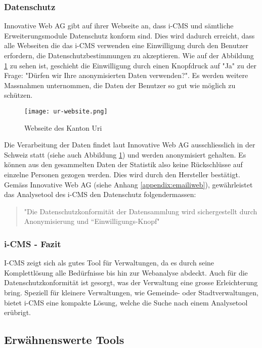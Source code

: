 \subsubsection{Datenschutz}
Innovative Web AG gibt auf ihrer Webseite \parencite{iwebwebsiteKanotonWeb} an, dass i-CMS und sämtliche Erweiterungsmodule Datenschutz konform sind. Dies wird dadurch erreicht, dass alle Webseiten die das i-CMS verwenden eine Einwilligung durch den Benutzer erfordern, die Datenschutzbestimmungen zu akzeptieren. Wie auf der Abbildung \ref{fig: urweb} zu sehen ist, geschieht die Einwilligung durch einen Knopfdruck auf "Ja" zu der Frage: "Dürfen wir Ihre anonymisierten Daten verwenden?". Es werden weitere Massnahmen unternommen, die Daten der Benutzer so gut wie möglich zu schützen.

\begin{figure}[h]
  \centering
  \texttt{[image: ur-website.png]}
  \caption{Webseite des Kanton Uri \parencite{webseiteKantonUri}}
  \label{fig: urweb}
\end{figure}

Die Verarbeitung der Daten findet laut Innovative Web AG \parencite{iwebwebsiteCMS} ausschliesslich in der Schweiz statt (siehe auch Abbildung \ref{fig: urweb}) und werden anonymisiert gehalten. Es können aus den gesammelten Daten der Statistik also keine Rückschlüsse auf einzelne Personen gezogen werden. Dies wird durch den Hersteller bestätigt. Gemäss Innovative Web AG (siehe Anhang \ref{appendix:emailiweb}), gewährleistet das Analysetool des i-CMS den Datenschutz folgendermassen:

\begin{quote}
  "Die Datenschutzkonformität der Datensammlung wird sichergestellt durch Anonymisierung und “Einwilligungs-Knopf"
\end{quote}

\subsubsection{i-CMS - Fazit}

I-CMS zeigt sich als gutes Tool für Verwaltungen, da es durch seine Komplettlösung alle Bedürfnisse bis hin zur Webanalyse abdeckt. Auch für die Datenschutzkonformität ist gesorgt, was der Verwaltung eine grosse Erleichterung bring. Speziell für kleinere Verwaltungen, wie Gemeinde- oder Stadtverwaltungen, bietet i-CMS eine kompakte Lösung, welche die Suche nach einem Analysetool erübrigt. 

\subsection{Erwähnenswerte Tools}

